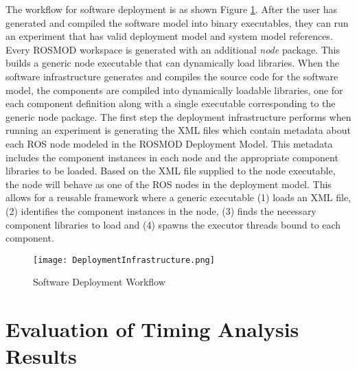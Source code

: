 The workflow for software deployment is as shown Figure \ref{fig:workflow}. After the user has generated and compiled the software model into binary executables, they can run an experiment that has valid deployment model and system model references. Every ROSMOD workspace is generated with an additional \emph{node} package. This builds a generic node executable that can dynamically load libraries. When the software infrastructure generates and compiles the source code for the software model, the components are compiled into dynamically loadable libraries, one for each component definition along with a single executable corresponding to the generic node package. The first step the deployment infrastructure performs when running an experiment is generating the XML files which contain metadata about each ROS node modeled in the ROSMOD Deployment Model. This metadata includes the component instances in each node and the appropriate component libraries to be loaded. Based on the XML file supplied to the node executable, the node will behave as one of the ROS nodes in the deployment model. This allows for a reusable framework where a generic executable (1) loads an XML file, (2) identifies the component instances in the node, (3) finds the necessary component libraries to load and (4) spawns the executor threads bound to each component.

\begin{figure}[ht]
	\centering
	\texttt{[image: DeploymentInfrastructure.png]}
	\caption{Software Deployment Workflow}
	\label{fig:workflow}
\end{figure}
\FloatBarrier

\section{Evaluation of Timing Analysis Results}

